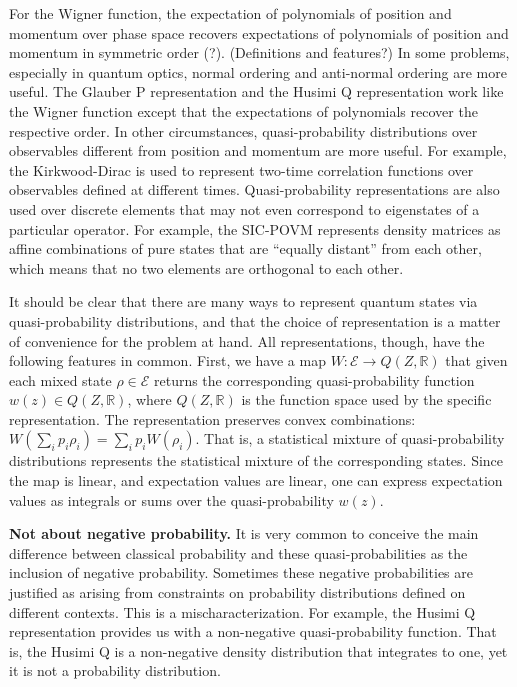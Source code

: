 \documentclass[10pt,twocolumn, nofootinbib]{revtex4-2}
\newcommand{\Ens}[1][E] {\mathcal{#1}} %
\begin{document}
For the Wigner function, the expectation of polynomials of position and momentum over phase space recovers expectations of polynomials of position and momentum in symmetric order (?). (Definitions and features?) In some problems, especially in quantum optics, normal ordering and anti-normal ordering are more useful. The Glauber P representation and the Husimi Q representation work like the Wigner function except that the expectations of polynomials recover the respective order. In other circumstances, quasi-probability distributions over observables different from position and momentum are more useful. For example, the Kirkwood-Dirac is used to represent two-time correlation functions over observables defined at different times. Quasi-probability representations are also used over discrete elements that may not even correspond to eigenstates of a particular operator. For example, the SIC-POVM represents density matrices as affine combinations of pure states that are ``equally distant'' from each other, which means that no two elements are orthogonal to each other.

It should be clear that there are many ways to represent quantum states via quasi-probability distributions, and that the choice of representation is a matter of convenience for the problem at hand. All representations, though, have the following features in common. First, we have a map $W : \Ens \to Q(Z,\mathbb{R})$ that given each mixed state $\rho \in \Ens$ returns the corresponding quasi-probability function $w(z) \in Q(Z,\mathbb{R})$, where $Q(Z,\mathbb{R})$ is the function space used by the specific representation. The representation preserves convex combinations: $W(\sum_i p_i \rho_i) = \sum_i p_i W(\rho_i)$. That is, a statistical mixture of quasi-probability distributions represents the statistical mixture of the corresponding states. Since the map is linear, and expectation values are linear, one can express expectation values as integrals or sums over the quasi-probability $w(z)$. 


\textbf{Not about negative probability.} It is very common to conceive the main difference between classical probability and these quasi-probabilities as the inclusion of negative probability. Sometimes these negative probabilities are justified as arising from constraints on probability distributions defined on different contexts. This is a mischaracterization. For example, the Husimi Q representation provides us with a non-negative quasi-probability function. That is, the Husimi Q is a non-negative density distribution that integrates to one, yet it is not a probability distribution.
\end{document}
